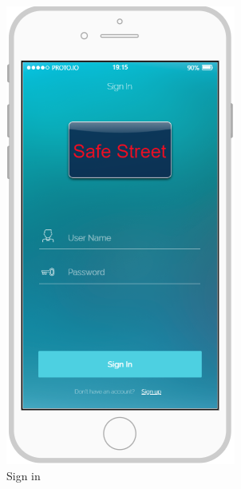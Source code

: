 \documentclass{article}
\begin{document}
\begin{figure}[H]
\begin{subfigure}[H]{0.49\linewidth}
				\includegraphics[width=\linewidth]{images/Sign_In.png}
				\caption{Sign in}
			\end{subfigure}	
			\begin{subfigure}[H]{0.49\linewidth}

\end{subfigure}
\end{figure}
\end{document}
